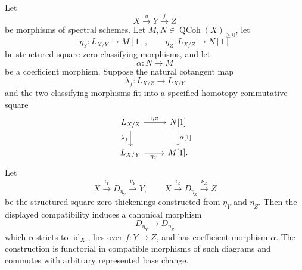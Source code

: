 \begin{lemma}
\label{lem:structured-square-zero-naturality}
Let
\[
    X\xrightarrow{u}Y\xrightarrow{f}Z
\]
be morphisms of spectral schemes.  Let $M,N\in\operatorname{QCoh}(X)_{\geq0}$,
let
\[
    \eta_Y:L_{X/Y}\longrightarrow M[1],
    \qquad
    \eta_Z:L_{X/Z}\longrightarrow N[1]
\]
be structured square-zero classifying morphisms, and let
\[
    \alpha:N\longrightarrow M
\]
be a coefficient morphism.  Suppose the natural cotangent map
\[
    \lambda_f:L_{X/Z}\longrightarrow L_{X/Y}
\]
and the two classifying morphisms fit into a specified homotopy-commutative
square
\[
\begin{tikzcd}
L_{X/Z} \arrow[r,"{\eta_Z}"] \arrow[d,"\lambda_f"'] &
N[1] \arrow[d,"{\alpha[1]}"]\\
L_{X/Y} \arrow[r,"\eta_Y"'] & M[1].
\end{tikzcd}
\]
Let
\[
    X\xrightarrow{i_Y}D_{\eta_Y}\xrightarrow{\nu_Y}Y,
    \qquad
    X\xrightarrow{i_Z}D_{\eta_Z}\xrightarrow{\nu_Z}Z
\]
be the structured square-zero thickenings constructed from $\eta_Y$ and
$\eta_Z$.  Then the displayed compatibility induces a canonical morphism
\[
    D_{\eta_Y}\longrightarrow D_{\eta_Z}
\]
which restricts to $\operatorname{id}_X$, lies over $f:Y\to Z$, and has
coefficient morphism $\alpha$.  The construction is functorial in compatible
morphisms of such diagrams and commutes with arbitrary represented base
change.
\end{lemma}

